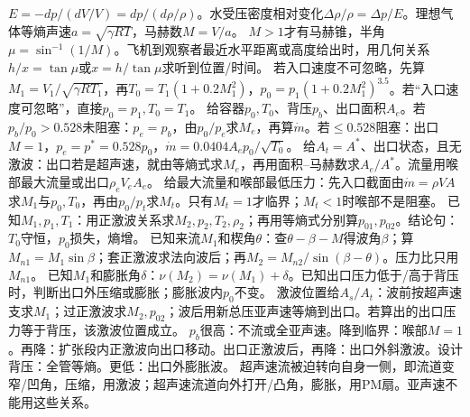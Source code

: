 $E=-dp/(dV/V)=dp/(d\rho/\rho)$。水受压密度相对变化$\Delta\rho/\rho=\Delta p/E$。理想气体等熵声速$a=\sqrt{\gamma RT}$，马赫数$M=V/a$。
$M>1$才有马赫锥，半角$\mu=\sin^{-1}(1/M)$。飞机到观察者最近水平距离或高度给出时，用几何关系$h/x=\tan\mu$或$x=h/\tan\mu$求听到位置/时间。
若入口速度不可忽略，先算$M_1=V_1/\sqrt{\gamma RT_1}$，再$T_0=T_1(1+0.2M_1^2)$，$p_0=p_1(1+0.2M_1^2)^{3.5}$。若“入口速度可忽略”，直接$p_0=p_1,T_0=T_1$。
给容器$p_0,T_0$、背压$p_b$、出口面积$A_e$。若$p_b/p_0>0.528$未阻塞：$p_e=p_b$，由$p_0/p_e$求$M_e$，再算$\dot m$。若$\le0.528$阻塞：出口$M=1$，$p_e=p^*=0.528p_0$，$\dot m=0.0404A_ep_0/\sqrt{T_0}$。
给$A_t=A^*$、出口状态，且无激波：出口若是超声速，就由等熵式求$M_e$，再用面积--马赫数求$A_e/A^*$。流量用喉部最大流量或出口$\rho_eV_eA_e$。
给最大流量和喉部最低压力：先入口截面由$\dot m=\rho VA$求$M_1$与$p_0,T_0$，再由$p_0/p_t$求$M_t$。只有$M_t=1$才临界；$M_t<1$时喉部不是阻塞。
已知$M_1,p_1,T_1$：用正激波关系求$M_2,p_2,T_2,\rho_2$；再用等熵式分别算$p_{01},p_{02}$。结论句：$T_0$守恒，$p_0$损失，熵增。
已知来流$M_1$和楔角$\theta$：查$\theta-\beta-M$得波角$\beta$；算$M_{n1}=M_1\sin\beta$；套正激波求法向波后；再$M_2=M_{n2}/\sin(\beta-\theta)$。压力比只用$M_{n1}$。
已知$M_1$和膨胀角$\delta$：$\nu(M_2)=\nu(M_1)+\delta$。已知出口压力低于/高于背压时，判断出口外压缩或膨胀；膨胀波内$p_0$不变。
激波位置给$A_s/A_t$：波前按超声速支求$M_1$；过正激波求$M_2,p_{02}$；波后用新总压亚声速等熵到出口。若算出的出口压力等于背压，该激波位置成立。
$p_b$很高：不流或全亚声速。降到临界：喉部$M=1$。再降：扩张段内正激波向出口移动。出口正激波后，再降：出口外斜激波。设计背压：全管等熵。更低：出口外膨胀波。
超声速流被迫转向自身一侧，即流道变窄/凹角，压缩，用激波；超声速流道向外打开/凸角，膨胀，用PM扇。亚声速不能用这些关系。

